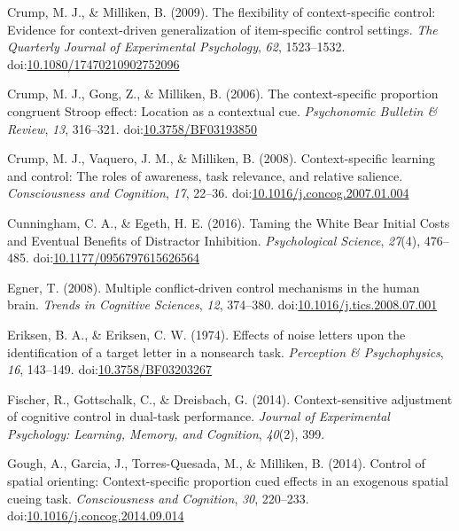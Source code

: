 \documentclass[english,,man,floatsintext]{apa6}
\begin{document}
\hypertarget{ref-crump_flexibility_2009}{}
Crump, M. J., \& Milliken, B. (2009). The flexibility of
context-specific control: Evidence for context-driven generalization of
item-specific control settings. \emph{The Quarterly Journal of
Experimental Psychology}, \emph{62}, 1523--1532.
doi:\href{https://doi.org/10.1080/17470210902752096}{10.1080/17470210902752096}

\hypertarget{ref-crump_context-specific_2006}{}
Crump, M. J., Gong, Z., \& Milliken, B. (2006). The context-specific
proportion congruent Stroop effect: Location as a contextual cue.
\emph{Psychonomic Bulletin \& Review}, \emph{13}, 316--321.
doi:\href{https://doi.org/10.3758/BF03193850}{10.3758/BF03193850}

\hypertarget{ref-crump_context-specific_2008}{}
Crump, M. J., Vaquero, J. M., \& Milliken, B. (2008). Context-specific
learning and control: The roles of awareness, task relevance, and
relative salience. \emph{Consciousness and Cognition}, \emph{17},
22--36.
doi:\href{https://doi.org/10.1016/j.concog.2007.01.004}{10.1016/j.concog.2007.01.004}

\hypertarget{ref-cunningham_taming_2016}{}
Cunningham, C. A., \& Egeth, H. E. (2016). Taming the White Bear Initial
Costs and Eventual Benefits of Distractor Inhibition.
\emph{Psychological Science}, \emph{27}(4), 476--485.
doi:\href{https://doi.org/10.1177/0956797615626564}{10.1177/0956797615626564}

\hypertarget{ref-egner_multiple_2008}{}
Egner, T. (2008). Multiple conflict-driven control mechanisms in the
human brain. \emph{Trends in Cognitive Sciences}, \emph{12}, 374--380.
doi:\href{https://doi.org/10.1016/j.tics.2008.07.001}{10.1016/j.tics.2008.07.001}

\hypertarget{ref-eriksen_effects_1974}{}
Eriksen, B. A., \& Eriksen, C. W. (1974). Effects of noise letters upon
the identification of a target letter in a nonsearch task.
\emph{Perception \& Psychophysics}, \emph{16}, 143--149.
doi:\href{https://doi.org/10.3758/BF03203267}{10.3758/BF03203267}

\hypertarget{ref-fischer_context-sensitive_2014}{}
Fischer, R., Gottschalk, C., \& Dreisbach, G. (2014). Context-sensitive
adjustment of cognitive control in dual-task performance. \emph{Journal
of Experimental Psychology: Learning, Memory, and Cognition},
\emph{40}(2), 399.

\hypertarget{ref-gough_control_2014}{}
Gough, A., Garcia, J., Torres-Quesada, M., \& Milliken, B. (2014).
Control of spatial orienting: Context-specific proportion cued effects
in an exogenous spatial cueing task. \emph{Consciousness and Cognition},
\emph{30}, 220--233.
doi:\href{https://doi.org/10.1016/j.concog.2014.09.014}{10.1016/j.concog.2014.09.014}
\end{document}
